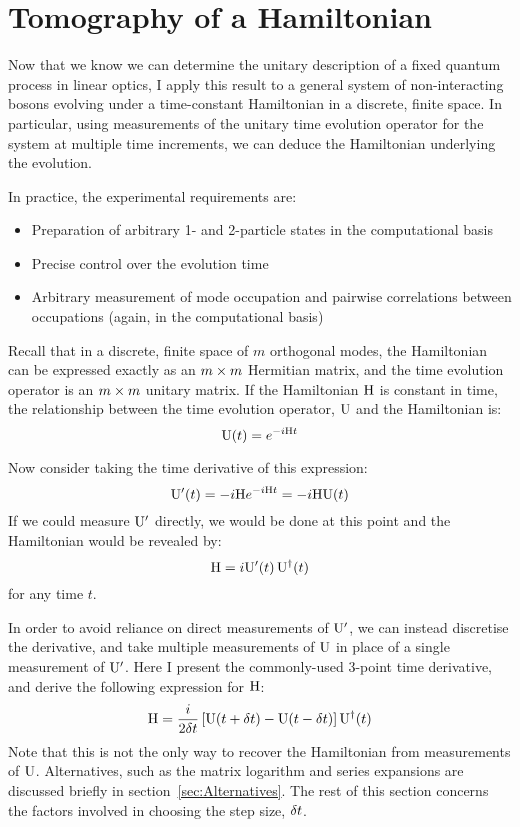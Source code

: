 \section{Tomography of a Hamiltonian}
\label{sec:Hamiltomo}
Now that we know we can determine the unitary description of a fixed quantum
process in linear optics, I apply this result to a general system of
non-interacting bosons evolving under a time-constant Hamiltonian in a discrete,
finite space. In particular, using measurements of the unitary time evolution
operator for the system at multiple time increments, we can deduce the
Hamiltonian underlying the evolution.

In practice, the experimental requirements are:
\begin{itemize}
  \item Preparation of arbitrary 1- and 2-particle states in the computational
  basis
  \item Precise control over the evolution time
  \item Arbitrary measurement of mode occupation and pairwise correlations
  between occupations (again, in the computational basis)
\end{itemize}

Recall that in a discrete, finite space of \(m\) orthogonal modes, the
Hamiltonian can be expressed exactly as an \(m \times m\) Hermitian matrix, and the
time evolution operator is an \(m \times m\) unitary matrix. If the Hamiltonian
\(\mathrm{H}\) is constant in time, the relationship between the time evolution
operator, \(\mathrm{U}\) and the Hamiltonian is:
\begin{equation}
  \label{eq:exponential}
  \mathrm{U} \!\left(t\right) = e^{-i \mathrm{H} t}
\end{equation}

Now consider taking the time derivative of this expression:
\begin{equation}
  \mathrm{U}^{\prime} \!\left(t\right) = -i \mathrm{H} e^{-i \mathrm{H} t} = -i \mathrm{H} \mathrm{U}
  \!\left(t\right)
\end{equation}
If we could measure \(\mathrm{U}^{\prime}\) directly, we would be done at this
point and the Hamiltonian would be revealed by:
\begin{equation}
  \mathrm{H} = i \mathrm{U}^{\prime} \!\left(t\right) \mathrm{U}^{\dagger} \!\left(t\right)
\end{equation}
for any time \(t\).

In order to avoid reliance on direct measurements of \(\mathrm{U}^{\prime}\), we
can instead discretise the derivative, and take multiple measurements of
\(\mathrm{U}\) in place of a single measurement of \(\mathrm{U}^{\prime}\). Here I
present the commonly-used 3-point time derivative, and derive the following
expression for \(\mathrm{H}\):
\begin{equation}
  \label{eq:hamiltomo}
  \mathrm{H} = \frac{i}{2 \delta t} \left[ \mathrm{U} \!\left(t+\delta t\right) - \mathrm{U} \!\left(t-\delta t\right)
  \right] \mathrm{U}^{\dagger} \!\left(t\right)
\end{equation}
Note that this is not the only way to recover the Hamiltonian from measurements
of \(\mathrm{U}\). Alternatives, such as the matrix logarithm and series expansions
are discussed briefly in section~\ref{sec:Alternatives}. The rest of this
section concerns the factors involved in choosing the step size, \(\delta t\).

